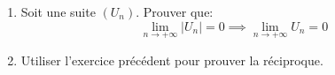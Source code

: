 \begin{exercice}

 \begin{enumerate}
  \item Soit une suite $(U_n)$. Prouver que:
\[ \lim_{n\to+\infty} |U_n|=0 \implies \lim_{n\to+\infty} U_n=0\] 

\item Utiliser l'exercice pr\'ec\'edent pour prouver la r\'eciproque.
  \end{enumerate}
  
\end{exercice}

